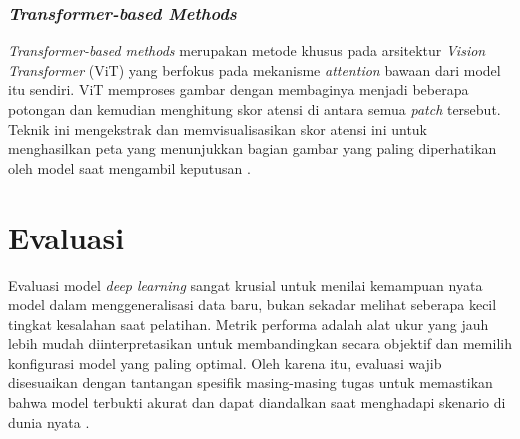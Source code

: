 \subsubsection{\textit{Transformer-based Methods}}
\textit{Transformer-based methods} merupakan metode khusus pada arsitektur \textit{Vision Transformer} (ViT) yang berfokus pada mekanisme \textit{attention} bawaan dari model itu sendiri. ViT memproses gambar dengan membaginya menjadi beberapa potongan dan kemudian menghitung skor atensi di antara semua \textit{patch} tersebut. Teknik ini mengekstrak dan memvisualisasikan skor atensi ini untuk menghasilkan peta yang menunjukkan bagian gambar yang paling diperhatikan oleh model saat mengambil keputusan \autocite{iftikhar2025explainable}.

\section{Evaluasi}
Evaluasi model \textit{deep learning} sangat krusial untuk menilai kemampuan nyata model dalam menggeneralisasi data baru, bukan sekadar melihat seberapa kecil tingkat kesalahan saat pelatihan. Metrik performa adalah alat ukur yang jauh lebih mudah diinterpretasikan untuk membandingkan secara objektif dan memilih konfigurasi model yang paling optimal. Oleh karena itu, evaluasi wajib disesuaikan dengan tantangan spesifik masing-masing tugas untuk memastikan bahwa model terbukti akurat dan dapat diandalkan saat menghadapi skenario di dunia nyata \autocite{terven2025survey}.

